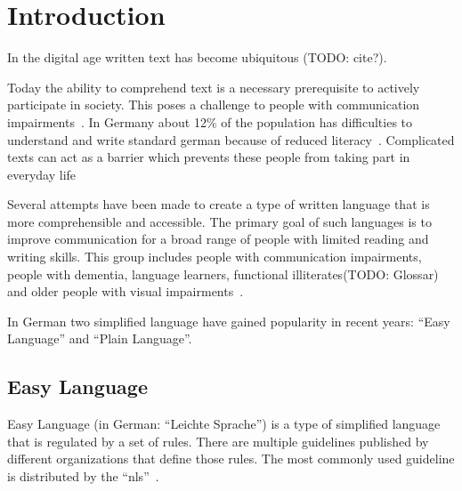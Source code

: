 \chapter{Introduction}\label{ch:introduction}

In the digital age written text has become ubiquitous (TODO: cite?).

Today the ability to comprehend text is a necessary prerequisite to actively participate in society. %
This poses a challenge to people with communication impairments~\autocite{easyLanguageBook}.
In Germany about 12\% of the population has difficulties to understand and write standard german because of reduced literacy~\autocite{schomacker2023data}.
Complicated texts can act as a barrier which prevents these people from taking part in everyday life~\autocite{easyLanguageBook}

Several attempts have been made to create a type of written language that is more comprehensible and accessible.
The primary goal of such languages is to improve communication for a broad range of people with limited reading and writing skills.
This group includes people with communication impairments, people with dementia, language learners, functional illiterates(TODO: Glossar) and older people with visual impairments~\autocite{easyLanguageBook}.

In German two simplified language have gained popularity in recent years: \enquote{Easy Language} and \enquote{Plain Language}.


\section{Easy Language}\label{sec:el}

Easy Language (in German: \enquote{Leichte Sprache}) is a type of simplified language that is regulated by a set of rules.
There are multiple guidelines published by different organizations that define those rules.
The most commonly used guideline is distributed by the \enquote{\gls{nls}}~\autocite{netzwerkLS, easyLanguageBook}.

